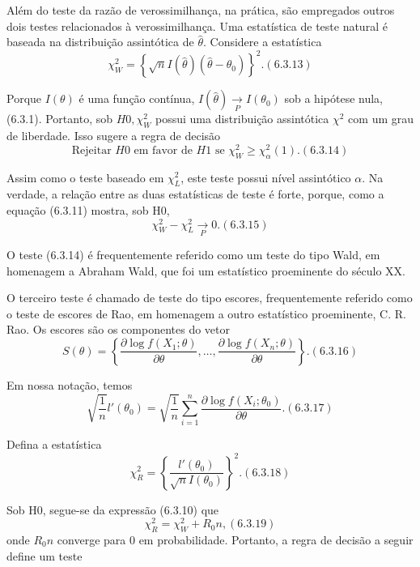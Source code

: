 \documentclass[12pt]{report}
\begin{document}
Além do teste da razão de verossimilhança, na prática, são empregados outros dois testes relacionados à verossimilhança. Uma estatística de teste natural é baseada na distribuição assintótica de $\hat{\theta}$. Considere a estatística
\[
\chi^2_W = \left\{\sqrt{n}I(\hat{\theta})(\hat{\theta} - \theta_0)\right\}^2. (6.3.13)
\]

Porque $I(\theta)$ é uma função contínua, $I(\hat{\theta}) \underset{P}{\rightarrow} I(\theta_0)$ sob a hipótese nula, (6.3.1). Portanto, sob $H0, \chi^2_W$ possui uma distribuição assintótica $\chi^2$ com um grau de liberdade. Isso sugere a regra de decisão
\[
\text{Rejeitar } H0 \text{ em favor de } H1 \text{ se } \chi^2_W \geq \chi^2_\alpha(1). (6.3.14)
\]

Assim como o teste baseado em $\chi^2_L$, este teste possui nível assintótico $\alpha$. Na verdade, a relação entre as duas estatísticas de teste é forte, porque, como a equação (6.3.11) mostra, sob H0,
\[
\chi^2_W - \chi^2_L \underset{P}{\rightarrow} 0. (6.3.15)
\]

O teste (6.3.14) é frequentemente referido como um teste do tipo Wald, em homenagem a Abraham Wald, que foi um estatístico proeminente do século XX.

O terceiro teste é chamado de teste do tipo escores, frequentemente referido como o teste de escores de Rao, em homenagem a outro estatístico proeminente, C. R. Rao. Os escores são os componentes do vetor
\[
S(\theta) = \left\{\frac{\partial \log f(X_1; \theta)}{\partial \theta}, \ldots, \frac{\partial \log f(X_n; \theta)}{\partial \theta}\right\}. (6.3.16)
\]

Em nossa notação, temos
\[
\sqrt{\frac{1}{n}}l'(\theta_0) = \sqrt{\frac{1}{n}}\sum_{i=1}^{n} \frac{\partial \log f(X_i; \theta_0)}{\partial \theta}. (6.3.17)
\]

Defina a estatística
\[
\chi^2_R = \left\{\frac{l'(\theta_0)}{\sqrt{n}I(\theta_0)}\right\}^2. (6.3.18)
\]

Sob H0, segue-se da expressão (6.3.10) que
\[
\chi^2_R = \chi^2_W + R_0n, (6.3.19)
\]
onde $R_0n$ converge para $0$ em probabilidade. Portanto, a regra de decisão a seguir define um teste
\end{document}
